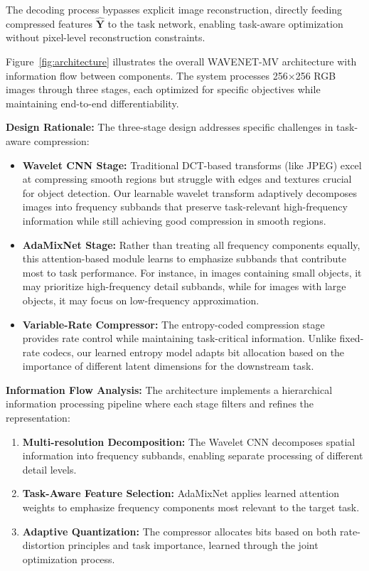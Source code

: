 \documentclass[conference]{IEEEtran}
\begin{document}
The decoding process bypasses explicit image reconstruction, directly feeding compressed features $\hat{\mathbf{Y}}$ to the task network, enabling task-aware optimization without pixel-level reconstruction constraints.

Figure~\ref{fig:architecture} illustrates the overall WAVENET-MV architecture with information flow between components. The system processes 256×256 RGB images through three stages, each optimized for specific objectives while maintaining end-to-end differentiability.

\textbf{Design Rationale:} The three-stage design addresses specific challenges in task-aware compression:
\begin{itemize}
\item \textbf{Wavelet CNN Stage:} Traditional DCT-based transforms (like JPEG) excel at compressing smooth regions but struggle with edges and textures crucial for object detection. Our learnable wavelet transform adaptively decomposes images into frequency subbands that preserve task-relevant high-frequency information while still achieving good compression in smooth regions.
\item \textbf{AdaMixNet Stage:} Rather than treating all frequency components equally, this attention-based module learns to emphasize subbands that contribute most to task performance. For instance, in images containing small objects, it may prioritize high-frequency detail subbands, while for images with large objects, it may focus on low-frequency approximation.
\item \textbf{Variable-Rate Compressor:} The entropy-coded compression stage provides rate control while maintaining task-critical information. Unlike fixed-rate codecs, our learned entropy model adapts bit allocation based on the importance of different latent dimensions for the downstream task.
\end{itemize}

\textbf{Information Flow Analysis:} The architecture implements a hierarchical information processing pipeline where each stage filters and refines the representation:
\begin{enumerate}
\item \textbf{Multi-resolution Decomposition:} The Wavelet CNN decomposes spatial information into frequency subbands, enabling separate processing of different detail levels.
\item \textbf{Task-Aware Feature Selection:} AdaMixNet applies learned attention weights to emphasize frequency components most relevant to the target task.
\item \textbf{Adaptive Quantization:} The compressor allocates bits based on both rate-distortion principles and task importance, learned through the joint optimization process.
\end{enumerate}
\end{document}
